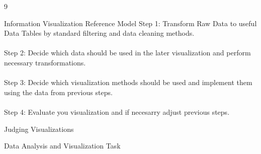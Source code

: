 \documentclass{article}
\begin{document}
    \begin{ukon-infie}[17.01.18]{9}

        \begin{exercise}[p=4]{Information Visualization Reference Model}  
       	Step 1: Transform Raw Data to useful Data Tables by standard filtering and data cleaning methods.\\\\
       	Step 2: Decide which data should be used in the later visualization and perform necessary transformations.\\\\
       	Step 3: Decide which visualization methods should be used and implement them using the data from previous steps.\\\\
       	Step 4: Evaluate you visualization and if necesarry adjust previous steps.
    	

		\end{exercise}
		
		\begin{exercise}[p=8]{Judging Visualizations}
		
		\end{exercise}
		
		\begin{exercise}[p=10]{Data Analysis and Visualization Task}
		
		\end{exercise}
		
		
\end{ukon-infie}
\end{document}
